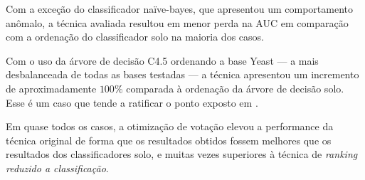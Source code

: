 Com a exceção do classificador naïve-bayes, que apresentou um comportamento anômalo, a técnica avaliada resultou em menor perda na AUC em comparação com a ordenação do classificador solo na maioria dos casos.

Com o uso da árvore de decisão C4.5 ordenando a base Yeast --- a mais desbalanceada de todas as bases testadas --- a técnica apresentou um incremento de aproximadamente $100\%$ comparada à ordenação da árvore de decisão solo. Esse é um caso que tende a ratificar o ponto exposto em \cite{langford08}.

Em quase todos os casos, a otimização de votação elevou a performance da técnica original de forma que os resultados obtidos fossem melhores que os resultados dos classificadores solo, e muitas vezes superiores à técnica de \emph{ranking reduzido a classificação}.